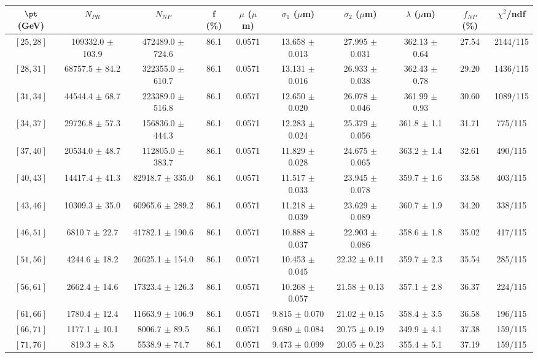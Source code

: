\begin{tabular}{c||c|c|c|c|c|c|c||c|c}
$\pt$ (GeV) & $N_{PR}$ & $N_{NP}$ & f (\%) & $\mu$ ($\mu$m) & $\sigma_1$ ($\mu$m) & $\sigma_2$ ($\mu$m)  & $\lambda$ ($\mu$m) & $f_{NP}$ (\%) & $\chi^2$/ndf \\
\hline
$[25, 28]$ & 109332.0 $\pm$ 103.9 & 472489.0 $\pm$ 724.6 & 86.1 & 0.0571 & 13.658 $\pm$ 0.013 & 27.995 $\pm$ 0.031 & 362.13 $\pm$ 0.64 & 27.54 & 2144/115\\
$[28, 31]$ & 68757.5 $\pm$ 84.2 & 322355.0 $\pm$ 610.7 & 86.1 & 0.0571 & 13.131 $\pm$ 0.016 & 26.933 $\pm$ 0.038 & 362.43 $\pm$ 0.78 & 29.20 & 1436/115\\
$[31, 34]$ & 44544.4 $\pm$ 68.7 & 223389.0 $\pm$ 516.8 & 86.1 & 0.0571 & 12.650 $\pm$ 0.020 & 26.078 $\pm$ 0.046 & 361.99 $\pm$ 0.93 & 30.60 & 1089/115\\
$[34, 37]$ & 29726.8 $\pm$ 57.3 & 156836.0 $\pm$ 444.3 & 86.1 & 0.0571 & 12.283 $\pm$ 0.024 & 25.379 $\pm$ 0.056 & 361.8 $\pm$ 1.1 & 31.71 & 775/115\\
$[37, 40]$ & 20534.0 $\pm$ 48.7 & 112805.0 $\pm$ 383.7 & 86.1 & 0.0571 & 11.829 $\pm$ 0.028 & 24.675 $\pm$ 0.065 & 363.2 $\pm$ 1.4 & 32.61 & 490/115\\
$[40, 43]$ & 14417.4 $\pm$ 41.3 & 82918.7 $\pm$ 335.0 & 86.1 & 0.0571 & 11.517 $\pm$ 0.033 & 23.945 $\pm$ 0.078 & 359.7 $\pm$ 1.6 & 33.58 & 403/115\\
$[43, 46]$ & 10309.3 $\pm$ 35.0 & 60965.6 $\pm$ 289.2 & 86.1 & 0.0571 & 11.218 $\pm$ 0.039 & 23.629 $\pm$ 0.089 & 360.7 $\pm$ 1.9 & 34.20 & 338/115\\
$[46, 51]$ & 6810.7 $\pm$ 22.7 & 41782.1 $\pm$ 190.6 & 86.1 & 0.0571 & 10.888 $\pm$ 0.037 & 22.903 $\pm$ 0.086 & 358.6 $\pm$ 1.8 & 35.02 & 417/115\\
$[51, 56]$ & 4244.6 $\pm$ 18.2 & 26625.1 $\pm$ 154.0 & 86.1 & 0.0571 & 10.453 $\pm$ 0.045 & 22.32 $\pm$ 0.11 & 359.7 $\pm$ 2.3 & 35.54 & 285/115\\
$[56, 61]$ & 2662.4 $\pm$ 14.6 & 17323.4 $\pm$ 126.3 & 86.1 & 0.0571 & 10.268 $\pm$ 0.057 & 21.58 $\pm$ 0.13 & 357.1 $\pm$ 2.8 & 36.37 & 224/115\\
$[61, 66]$ & 1780.4 $\pm$ 12.4 & 11663.9 $\pm$ 106.9 & 86.1 & 0.0571 & 9.815 $\pm$ 0.070 & 21.02 $\pm$ 0.15 & 358.4 $\pm$ 3.5 & 36.58 & 196/115\\
$[66, 71]$ & 1177.1 $\pm$ 10.1 & 8006.7 $\pm$ 89.5 & 86.1 & 0.0571 & 9.680 $\pm$ 0.084 & 20.75 $\pm$ 0.19 & 349.9 $\pm$ 4.1 & 37.38 & 159/115\\
$[71, 76]$ & 819.3 $\pm$ 8.5 & 5538.9 $\pm$ 74.7 & 86.1 & 0.0571 & 9.473 $\pm$ 0.099 & 20.05 $\pm$ 0.23 & 355.4 $\pm$ 5.1 & 37.19 & 159/115\\

\end{tabular}
